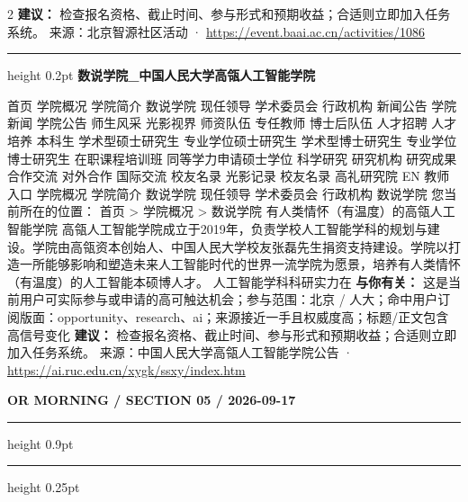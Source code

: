 \documentclass[10.5pt]{ctexart}
\begin{document}
\begin{multicols}{2}
\textbf{建议：} 检查报名资格、截止时间、参与形式和预期收益；合适则立即加入任务系统。
{\footnotesize\color{ormuted} 来源：北京智源社区活动 · \url{https://event.baai.ac.cn/activities/1086}}
\vspace{2mm}
\hrule height 0.2pt
\vspace{2mm}
{\large\bfseries 数说学院\_中国人民大学高瓴人工智能学院}\par
首页 学院概况 学院简介 数说学院 现任领导 学术委员会 行政机构 新闻公告 学院新闻 学院公告 师生风采 光影视界 师资队伍 专任教师 博士后队伍 人才招聘 人才培养 本科生 学术型硕士研究生 专业学位硕士研究生 学术型博士研究生 专业学位博士研究生 在职课程培训班 同等学力申请硕士学位 科学研究 研究机构 研究成果 合作交流 对外合作 国际交流 校友名录 光影记录 校友名录 高礼研究院 EN 教师入口 学院概况 学院简介 数说学院 现任领导 学术委员会 行政机构 数说学院 您当前所在的位置： 首页 > 学院概况 > 数说学院 有人类情怀（有温度）的高瓴人工智能学院 高瓴人工智能学院成立于2019年，负责学校人工智能学科的规划与建设。学院由高瓴资本创始人、中国人民大学校友张磊先生捐资支持建设。学院以打造一所能够影响和塑造未来人工智能时代的世界一流学院为愿景，培养有人类情怀（有温度）的人工智能本硕博人才。 人工智能学科科研实力在
\textbf{与你有关：} 这是当前用户可实际参与或申请的高可触达机会；参与范围：北京 / 人大；命中用户订阅版面：opportunity、research、ai；来源接近一手且权威度高；标题/正文包含高信号变化
\textbf{建议：} 检查报名资格、截止时间、参与形式和预期收益；合适则立即加入任务系统。
{\footnotesize\color{ormuted} 来源：中国人民大学高瓴人工智能学院公告 · \url{https://ai.ruc.edu.cn/xygk/ssxy/index.htm}}
\end{multicols}
\newpage
{\small\bfseries OR MORNING / SECTION 05 / 2026-09-17}
\vspace{2mm}
\hrule height 0.9pt
\vspace{1.5mm}
\hrule height 0.25pt
\vspace{4mm}
\end{document}
